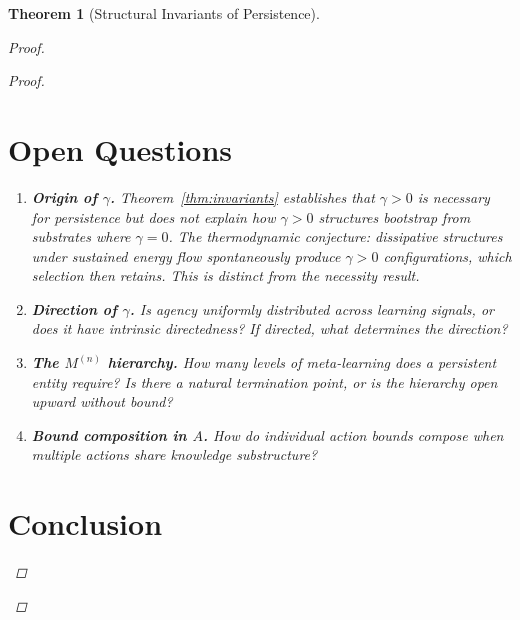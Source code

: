 \documentclass[11pt]{article}
\newtheorem{theorem}{Theorem}
\theoremstyle{definition}
\theoremstyle{remark}
\begin{document}
\begin{theorem}[Structural Invariants of Persistence]
\begin{proof}
\begin{proof}
\section{Open Questions}
\label{sec:open}

\begin{enumerate}
\item \textbf{Origin of $\gamma$.} Theorem~\ref{thm:invariants} establishes
      that $\gamma > 0$ is necessary for persistence but does not explain how
      $\gamma > 0$ structures bootstrap from substrates where $\gamma = 0$. The
      thermodynamic conjecture: dissipative structures
      \cite{Prigogine1984, England2013} under sustained energy flow
      spontaneously produce $\gamma > 0$ configurations, which selection then
      retains. This is distinct from the necessity result.

\item \textbf{Direction of $\gamma$.} Is agency uniformly distributed across
      learning signals, or does it have intrinsic directedness? If
      directed, what determines the direction?

\item \textbf{The $M^{(n)}$ hierarchy.} How many levels of
      meta-learning does a persistent entity require? Is there a natural
      termination point, or is the hierarchy open upward without bound?

\item \textbf{Bound composition in $A$.} How do individual action
      bounds compose when multiple actions share knowledge
      substructure?
\end{enumerate}

\section{Conclusion}
\label{sec:conclusion}


\end{proof}
\end{proof}
\end{theorem}
\end{document}
